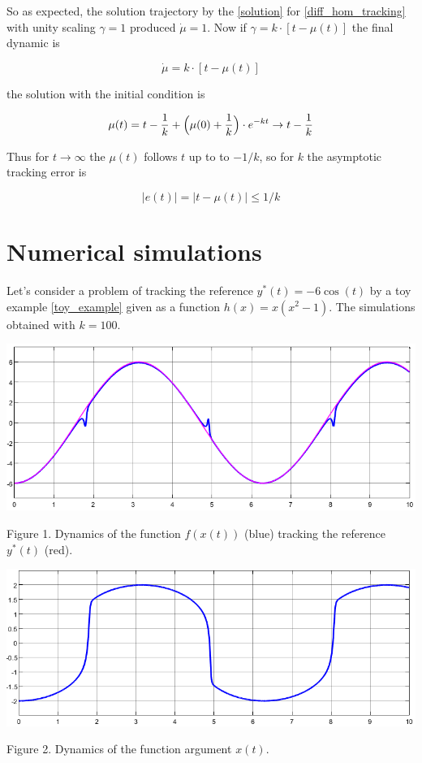 \documentclass[11pt,american]{article}
\begin{document}
So as expected, the solution trajectory by the \eqref{solution} for \eqref{diff_hom_tracking} with unity scaling $\gamma = 1$ produced $\dot \mu = 1$.
Now if $\gamma = k \cdot [t - \mu(t)]$ the final dynamic is

\begin{equation}
\dot \mu = k \cdot [t - \mu(t)]
\end{equation}

the solution with the initial condition is

\begin{equation}
\mu(t) = t - \frac{1}{k} + \Bigl(\mu(0)+\frac{1}{k}\Bigr) \cdot e^{-kt} \to t - \frac{1}{k}
\end{equation}

Thus for $t \to \infty$ the $\mu(t)$ follows $t$ up to to $-1/k$, so for $k$ the asymptotic tracking error is

\begin{equation}
|e(t)| = |t - \mu(t)| \le 1/k
\end{equation}


\section{Numerical simulations}

Let's consider a problem of tracking the reference $y^*(t) = -6 \cos(t)$ by a toy example \eqref{toy_example} given as a function $h(x) = x (x^2 - 1)$.
The simulations obtained with $k = 100$.

\begin{center}
\ifpdf %
  \includegraphics[width=1\textwidth]{toy_y.png}
\fi

Figure 1. Dynamics of the function $f(x(t))$ (blue) tracking the reference $y^*(t)$ (red).
\end{center}

\begin{center}
\ifpdf %
  \includegraphics[width=1\textwidth]{toy_x.png}
\fi

Figure 2. Dynamics of the function argument $x(t)$.
\end{center}
\end{document}
